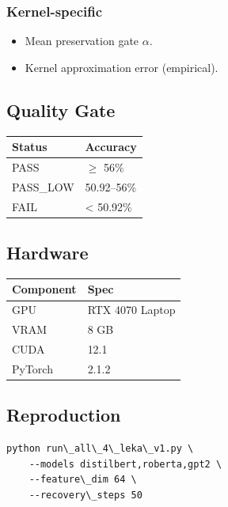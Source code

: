 \subsubsection{Kernel-specific}
\begin{itemize}
\item Mean preservation gate $\alpha$.
\item Kernel approximation error (empirical).

\end{itemize}
\subsection{Quality Gate}

\begin{table}[H]
\centering
\small
\begin{tabular}{ll}
\toprule
\textbf{Status} & \textbf{Accuracy} \\
\midrule
PASS & $\ge$ 56\% \\
PASS\_LOW & 50.92--56\% \\
FAIL & \textless{} 50.92\% \\
\bottomrule
\end{tabular}
\end{table}

\subsection{Hardware}

\begin{table}[H]
\centering
\small
\begin{tabular}{ll}
\toprule
\textbf{Component} & \textbf{Spec} \\
\midrule
GPU & RTX 4070 Laptop \\
VRAM & 8 GB \\
CUDA & 12.1 \\
PyTorch & 2.1.2 \\
\bottomrule
\end{tabular}
\end{table}

\subsection{Reproduction}

\begin{lstlisting}
python run\_all\_4\_leka\_v1.py \
    --models distilbert,roberta,gpt2 \
    --feature\_dim 64 \
    --recovery\_steps 50
\end{lstlisting}

